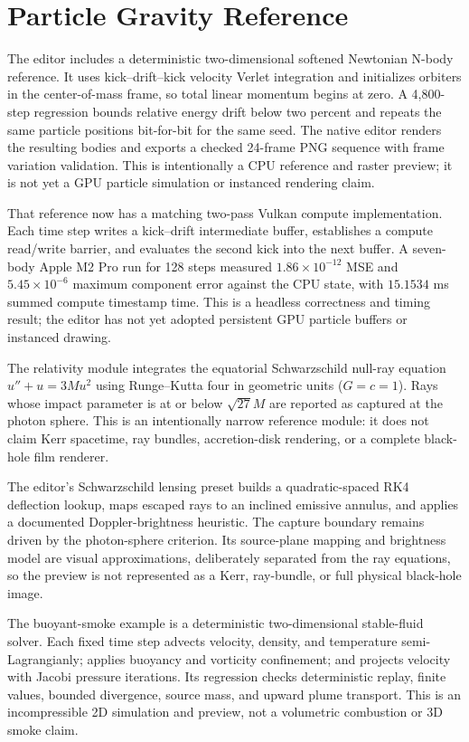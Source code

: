 \documentclass[10pt]{article}
\begin{document}
\section{Particle Gravity Reference}

The editor includes a deterministic two-dimensional softened Newtonian N-body reference. It uses
kick--drift--kick velocity Verlet integration and initializes orbiters in the center-of-mass frame,
so total linear momentum begins at zero. A 4,800-step regression bounds relative energy drift below
two percent and repeats the same particle positions bit-for-bit for the same seed. The native
editor renders the resulting bodies and exports a checked 24-frame PNG sequence with frame
variation validation. This is intentionally a CPU reference and raster preview; it is not yet a
GPU particle simulation or instanced rendering claim.

That reference now has a matching two-pass Vulkan compute implementation. Each time step writes a
kick--drift intermediate buffer, establishes a compute read/write barrier, and evaluates the second
kick into the next buffer. A seven-body Apple M2 Pro run for 128 steps measured
$1.86\times10^{-12}$ MSE and $5.45\times10^{-6}$ maximum component error against the CPU state,
with $15.1534$ ms summed compute timestamp time. This is a headless correctness and timing result;
the editor has not yet adopted persistent GPU particle buffers or instanced drawing.

The relativity module integrates the equatorial Schwarzschild null-ray equation
$u'' + u = 3Mu^2$ using Runge--Kutta four in geometric units ($G=c=1$). Rays whose impact parameter
is at or below $\sqrt{27}M$ are reported as captured at the photon sphere. This is an intentionally
narrow reference module: it does not claim Kerr spacetime, ray bundles, accretion-disk rendering,
or a complete black-hole film renderer.

The editor's Schwarzschild lensing preset builds a quadratic-spaced RK4 deflection lookup, maps
escaped rays to an inclined emissive annulus, and applies a documented Doppler-brightness heuristic.
The capture boundary remains driven by the photon-sphere criterion. Its source-plane mapping and
brightness model are visual approximations, deliberately separated from the ray equations, so the
preview is not represented as a Kerr, ray-bundle, or full physical black-hole image.

The buoyant-smoke example is a deterministic two-dimensional stable-fluid solver. Each fixed time
step advects velocity, density, and temperature semi-Lagrangianly; applies buoyancy and vorticity
confinement; and projects velocity with Jacobi pressure iterations. Its regression checks deterministic
replay, finite values, bounded divergence, source mass, and upward plume transport. This is an
incompressible 2D simulation and preview, not a volumetric combustion or 3D smoke claim.
\end{document}
